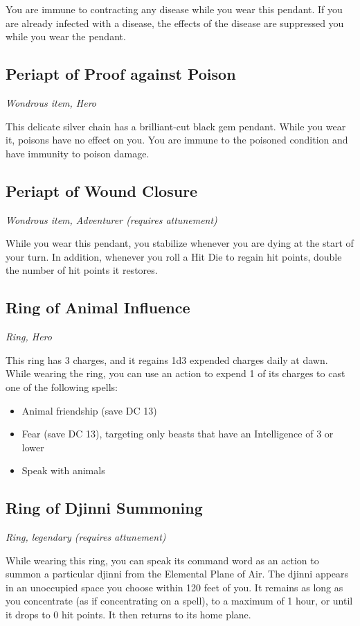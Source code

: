 You are immune to contracting any disease while you wear this pendant. If you are already infected with a disease, the effects of the disease are suppressed you while you wear the pendant.

\subsection{Periapt of Proof against Poison}
\textit{Wondrous item, Hero}

This delicate silver chain has a brilliant-cut black gem pendant. While you wear it, poisons have no effect on you. You are immune to the poisoned condition and have immunity to poison damage.

\subsection{Periapt of Wound Closure}
\textit{Wondrous item, Adventurer (requires attunement)}

While you wear this pendant, you stabilize whenever you are dying at the start of your turn. In addition, whenever you roll a Hit Die to regain hit points, double the number of hit points it restores.

\subsection{Ring of Animal Influence}
\textit{Ring, Hero} 

This ring has 3 charges, and it regains 1d3 expended charges daily at dawn. While wearing the ring, you can use an action to expend 1 of its charges to cast one of the following spells:
\begin{itemize}
 \item Animal friendship (save DC 13)
 \item Fear (save DC 13), targeting only beasts that have an Intelligence of 3 or lower
 \item Speak with animals
\end{itemize}

\subsection{Ring of Djinni Summoning}
\textit{Ring, legendary (requires attunement)}

While wearing this ring, you can speak its command word as an action to summon a particular djinni from the Elemental Plane of Air. The djinni appears in an unoccupied space you choose within 120 feet of you. It remains as long as you concentrate (as if concentrating on a spell), to a maximum of 1 hour, or until it drops to 0 hit points. It then returns to its home plane.

